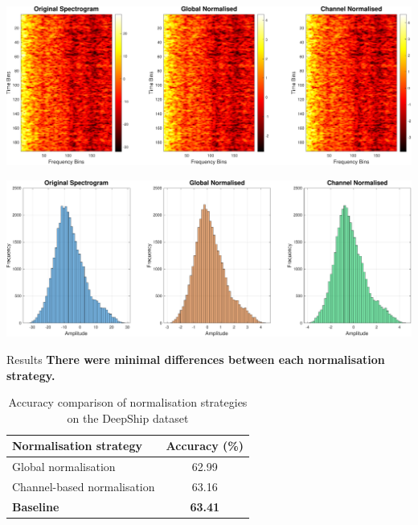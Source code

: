 \documentclass[]{beamer}
\begin{document}
\begin{frame}[plain]{}
    \centering
    \includegraphics[width=\linewidth]{img/spectrogramComparison.pdf}
    
    \vspace{0.3cm}
    
    \includegraphics[clip,trim={0 0 0 0.6cm},width=\linewidth]{img/histogramComparison.pdf}
\end{frame}

\begin{frame}{Results}
    \textbf{There were minimal differences between each normalisation strategy.}
    
    \vspace{0.5cm}
    
    \begin{table}
    \scriptsize
    \captionsetup{font=scriptsize}
    \centering
    \caption{Accuracy comparison of normalisation strategies on the DeepShip dataset}
    \begin{tabular}{@{}lc@{}}
        \toprule
        \textbf{Normalisation strategy} & \textbf{Accuracy (\%)} \\
        \midrule
        Global normalisation            & 62.99 \\
        Channel-based normalisation     & 63.16 \\
        \textbf{Baseline} & \textbf{63.41} \\
        \bottomrule
    \end{tabular}
    \end{table}
\end{frame}
\end{document}
